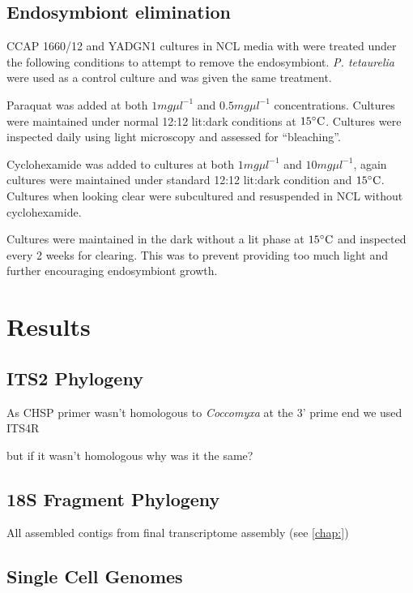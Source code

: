 \subsection{Endosymbiont elimination}

CCAP 1660/12 and YADGN1 cultures in NCL media with were treated under the following
conditions to attempt to remove the endosymbiont. 
\textit{P. tetaurelia} were used as a control culture and was
given the same treatment. 

Paraquat was added at both \(1mg\mu l^{-1}\) and
\(0.5mg\mu l^{-1}\) concentrations.
Cultures were maintained under normal 12:12 lit:dark 
conditions at \(15\celsius\).  Cultures were inspected
daily using light microscopy and assessed for ``bleaching''.

Cyclohexamide was added to cultures at both \(1mg\mu l^{-1}\)
and \(10mg\mu l^{-1}\), again cultures were maintained under
standard 12:12 lit:dark condition and \(15\celsius\). 
Cultures when looking clear were subcultured and resuspended in 
NCL without cyclohexamide.

Cultures were maintained in the dark without a lit phase
at \(15\celsius\) and inspected every 2 weeks for clearing.
This was to prevent providing too much light and 
further encouraging endosymbiont growth. 

\section{Results}

\subsection{ITS2 Phylogeny}


As CHSP primer wasn't homologous to \textit{Coccomyxa} 
at the 3' prime end we used ITS4R

but if it wasn't homologous why was it the same?


\subsection{18S Fragment Phylogeny}

All assembled contigs from final transcriptome assembly (see \ref{chap:})


\subsection{Single Cell Genomes}


